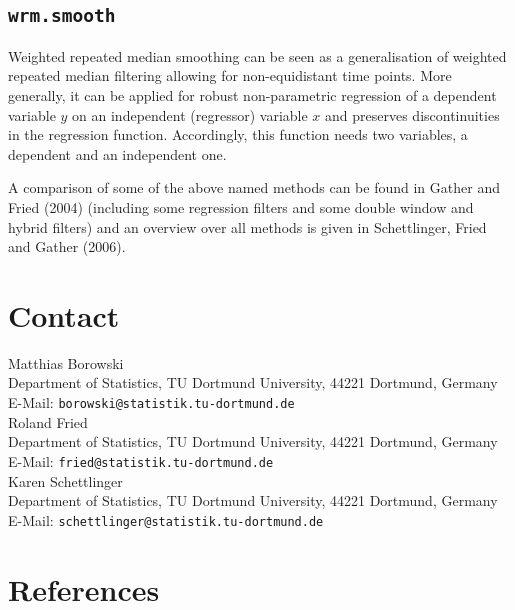 \documentclass[a4paper]{scrartcl}
\begin{document}
\subsection{\texttt{wrm.smooth}}

Weighted repeated median smoothing can be seen as a generalisation
of weighted repeated median filtering allowing for non-equidistant
time points. More generally, it can be applied for robust
non-parametric regression of a dependent variable $y$ on an
independent (regressor) variable $x$ and preserves discontinuities
in the regression function. Accordingly, this function needs two
variables, a dependent and an independent one.




\vspace{1.5cm}
\noindent
A comparison of some of the above named methods can be found in
Gather and Fried (2004) (including some regression filters and
some double window and hybrid filters) and an overview over all
methods is given in Schettlinger, Fried and Gather (2006).

\section{Contact}


Matthias Borowski\\
Department of Statistics, TU Dortmund University, 44221 Dortmund, Germany\\
E-Mail: \texttt{borowski@statistik.tu-dortmund.de}\vspace*{0.5cm}\\
Roland Fried\\
Department of Statistics, TU Dortmund University, 44221 Dortmund, Germany\\
E-Mail: \texttt{fried@statistik.tu-dortmund.de}\vspace*{0.5cm}\\
Karen Schettlinger\\
Department of Statistics, TU Dortmund University, 44221 Dortmund, Germany\\
E-Mail: \texttt{schettlinger@statistik.tu-dortmund.de}

\section{References}
\end{document}
